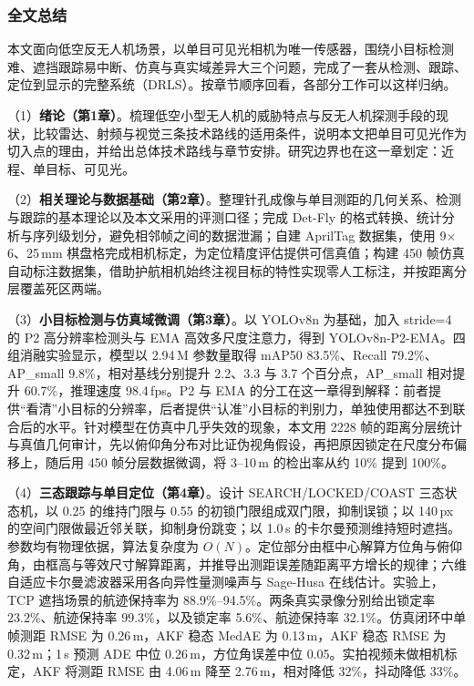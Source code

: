 \subsubsection{全文总结}

本文面向低空反无人机场景，以单目可见光相机为唯一传感器，围绕小目标检测难、遮挡跟踪易中断、仿真与真实域差异大三个问题，完成了一套从检测、跟踪、定位到显示的完整系统（DRLS）。按章节顺序回看，各部分工作可以这样归纳。

（1）\textbf{绪论（第1章）}。梳理低空小型无人机的威胁特点与反无人机探测手段的现状，比较雷达、射频与视觉三条技术路线的适用条件，说明本文把单目可见光作为切入点的理由，并给出总体技术路线与章节安排。研究边界也在这一章划定：近程、单目标、可见光。

（2）\textbf{相关理论与数据基础（第2章）}。整理针孔成像与单目测距的几何关系、检测与跟踪的基本理论以及本文采用的评测口径；完成 Det-Fly 的格式转换、统计分析与序列级划分，避免相邻帧之间的数据泄漏；自建 AprilTag 数据集，使用 9$\times$6、25\,mm 棋盘格完成相机标定，为定位精度评估提供可信真值；构建 450 帧仿真自动标注数据集，借助护航相机始终注视目标的特性实现零人工标注，并按距离分层覆盖死区两端。

（3）\textbf{小目标检测与仿真域微调（第3章）}。以 YOLOv8n 为基础，加入 stride=4 的 P2 高分辨率检测头与 EMA 高效多尺度注意力，得到 YOLOv8n-P2-EMA。四组消融实验显示，模型以 2.94\,M 参数量取得 mAP50 83.5\%、Recall 79.2\%、AP\_small 9.8\%，相对基线分别提升 2.2、3.3 与 3.7 个百分点，AP\_small 相对提升 60.7\%，推理速度 98.4\,fps。P2 与 EMA 的分工在这一章得到解释：前者提供“看清”小目标的分辨率，后者提供“认准”小目标的判别力，单独使用都达不到联合后的水平。针对模型在仿真中几乎失效的现象，本文用 2228 帧的距离分层统计与真值几何审计，先以俯仰角分布对比证伪视角假设，再把原因锁定在尺度分布偏移上，随后用 450 帧分层数据微调，将 3--10\,m 的检出率从约 10\% 提到 100\%。

（4）\textbf{三态跟踪与单目定位（第4章）}。设计 SEARCH/LOCKED/COAST 三态状态机，以 0.25 的维持门限与 0.55 的初锁门限组成双门限，抑制误锁；以 140\,px 的空间门限做最近邻关联，抑制身份跳变；以 1.0\,s 的卡尔曼预测维持短时遮挡。参数均有物理依据，算法复杂度为 $O(N)$。定位部分由框中心解算方位角与俯仰角，由框高与等效尺寸解算距离，并推导出测距误差随距离平方增长的规律；六维自适应卡尔曼滤波器采用各向异性量测噪声与 Sage-Husa 在线估计。实验上，TCP 遮挡场景的航迹保持率为 88.9\%--94.5\%。两条真实录像分别给出锁定率 23.2\%、航迹保持率 99.3\%，以及锁定率 5.6\%、航迹保持率 32.1\%。仿真闭环中单帧测距 RMSE 为 0.26\,m，AKF 稳态 MedAE 为 0.13\,m，AKF 稳态 RMSE 为 0.32\,m；1\,s 预测 ADE 中位 0.26\,m，方位角误差中位 0.05\textdegree。实拍视频未做相机标定，AKF 将测距 RMSE 由 4.06\,m 降至 2.76\,m，相对降低 32\%，抖动降低 33\%。

